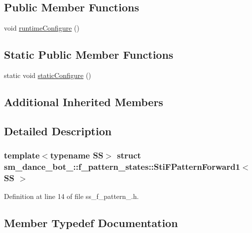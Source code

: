 \subsection*{Public Member Functions}
\begin{DoxyCompactItemize}
\item 
void \hyperlink{classsm__dance__bot__2_1_1f__pattern__states_1_1StiFPatternForward1_ade68d5e3be7830238e7f22b4b61b16a3}{runtime\+Configure} ()
\end{DoxyCompactItemize}
\subsection*{Static Public Member Functions}
\begin{DoxyCompactItemize}
\item 
static void \hyperlink{classsm__dance__bot__2_1_1f__pattern__states_1_1StiFPatternForward1_a3f84f5e963c1618774586f6982549eda}{static\+Configure} ()
\end{DoxyCompactItemize}
\subsection*{Additional Inherited Members}


\subsection{Detailed Description}
\subsubsection*{template$<$typename SS$>$\newline
struct sm\+\_\+dance\+\_\+bot\+\_\+::f\+\_\+pattern\+\_\+states\+::\+Sti\+F\+Pattern\+Forward1$<$ S\+S $>$}



Definition at line 14 of file ss\+\_\+f\+\_\+pattern\+\_.\+h.



\subsection{Member Typedef Documentation}
\mbox{\label{classsm__dance__bot__2_1_1f__pattern__states_1_1StiFPatternForward1_aaa28937a418a04a39855fdfd6f3e7eb8}} 
